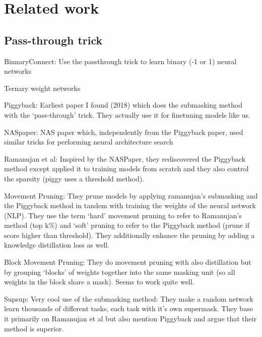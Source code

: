 \documentclass[12pt]{report}
\begin{document}
    \chapter{Related work}


    \section{Pass-through trick}
    BinnaryConnect: Use the passthrough trick to learn binary (-1 or 1) neural networks~\cite{courbariauxBinaryConnectTrainingDeep2016, hubaraBinarizedNeuralNetworks}

    Ternary weight networks ~\cite{liTernaryWeightNetworks2022, zhuTrainedTernaryQuantization2017}

    Piggyback: Earliest paper I found (2018) which does the submasking method with the ‘pass-through’ trick. They actually use it for finetuning models like us.~\cite{mallyaPiggybackAdaptingSingle2018}

    NASpaper: NAS paper which, independently from the Piggyback paper, used similar tricks for performing neural architecture
    search~\cite{wortsmanDiscoveringNeuralWirings2019a}

    Ramanujan et al: Inspired by the NASPaper, they rediscovered the Piggyback method except applied it to training models from scratch and they also control the sparsity (piggy uses a threshold method).~\cite{ramanujanWhatHiddenRandomly2020}

    Movement Pruning: They prune models by applying ramanujan’s submasking and the Piggyback method in tandem with training the weights of the neural network (NLP). They use the term ‘hard’ movement pruning to refer to Ramanujan’s method (top k\%) and ‘soft’ pruning to refer to the Piggyback method (prune if score higher than threshold). They additionally enhance the pruning by adding a knowledge distillation loss as well.~\cite{sanhMovementPruningAdaptive}

    Block Movement Pruning: They do movement pruning with also distillation but by grouping ‘blocks’ of weights together into the same masking unit (so all weights in the block share a mask). Seems to work quite well.~\cite{lagunasBlockPruningFaster2021}

    Supsup: Very cool use of the submasking method: They make a random network learn thousands of different tasks, each task with it’s own supermask. They base it primarily on Ramanujan et al but also mention Piggyback and argue that their method is superior.~\cite{wortsmanSupermasksSuperposition}
\end{document}
